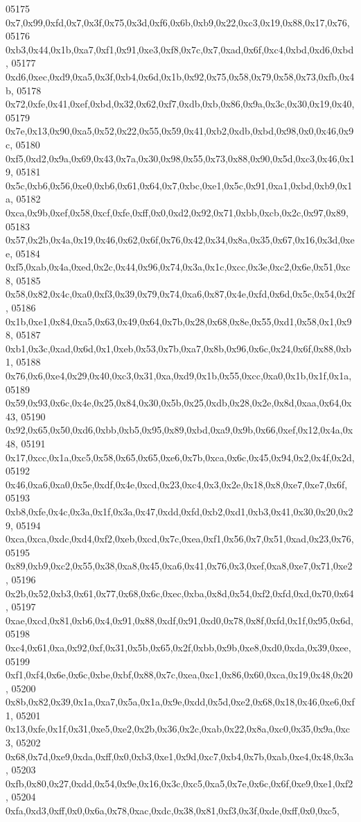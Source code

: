 \begin{DoxyCode}
05175   0x7,0x99,0xfd,0x7,0x3f,0x75,0x3d,0xf6,0x6b,0xb9,0x22,0xc3,0x19,0x88,0x17,0x76,
05176   0xb3,0x44,0x1b,0xa7,0xf1,0x91,0xe3,0xf8,0x7c,0x7,0xad,0x6f,0xc4,0xbd,0xd6,0xbd,
05177   0xd6,0xec,0xd9,0xa5,0x3f,0xb4,0x6d,0x1b,0x92,0x75,0x58,0x79,0x58,0x73,0xfb,0x4b,
05178   0x72,0xfe,0x41,0xef,0xbd,0x32,0x62,0xf7,0xdb,0xb,0x86,0x9a,0x3c,0x30,0x19,0x40,
05179   0x7e,0x13,0x90,0xa5,0x52,0x22,0x55,0x59,0x41,0xb2,0xdb,0xbd,0x98,0x0,0x46,0x9c,
05180   0xf5,0xd2,0x9a,0x69,0x43,0x7a,0x30,0x98,0x55,0x73,0x88,0x90,0x5d,0xc3,0x46,0x19,
05181   0x5c,0xb6,0x56,0xe0,0xb6,0x61,0x64,0x7,0xbc,0xe1,0x5c,0x91,0xa1,0xbd,0xb9,0x1a,
05182   0xca,0x9b,0xef,0x58,0xcf,0xfe,0xff,0x0,0xd2,0x92,0x71,0xbb,0xcb,0x2c,0x97,0x89,
05183   0x57,0x2b,0x4a,0x19,0x46,0x62,0x6f,0x76,0x42,0x34,0x8a,0x35,0x67,0x16,0x3d,0xee,
05184   0xf5,0xab,0x4a,0xed,0x2c,0x44,0x96,0x74,0x3a,0x1c,0xcc,0x3e,0xc2,0x6e,0x51,0xc8,
05185   0x58,0x82,0x4c,0xa0,0xf3,0x39,0x79,0x74,0xa6,0x87,0x4e,0xfd,0x6d,0x5c,0x54,0x2f,
05186   0x1b,0xe1,0x84,0xa5,0x63,0x49,0x64,0x7b,0x28,0x68,0x8e,0x55,0xd1,0x58,0x1,0x98,
05187   0xb1,0x3c,0xad,0x6d,0x1,0xeb,0x53,0x7b,0xa7,0x8b,0x96,0x6c,0x24,0x6f,0x88,0xb1,
05188   0x76,0x6,0xe4,0x29,0x40,0xc3,0x31,0xa,0xd9,0x1b,0x55,0xcc,0xa0,0x1b,0x1f,0x1a,
05189   0x59,0x93,0x6c,0x4e,0x25,0x84,0x30,0x5b,0x25,0xdb,0x28,0x2e,0x8d,0xaa,0x64,0x43,
05190   0x92,0x65,0x50,0xd6,0xbb,0xb5,0x95,0x89,0xbd,0xa9,0x9b,0x66,0xef,0x12,0x4a,0x48,
05191   0x17,0xcc,0x1a,0xc5,0x58,0x65,0x65,0xe6,0x7b,0xca,0x6c,0x45,0x94,0x2,0x4f,0x2d,
05192   0x46,0xa6,0xa0,0x5e,0xdf,0x4e,0xcd,0x23,0xc4,0x3,0x2e,0x18,0x8,0xe7,0xe7,0x6f,
05193   0xb8,0xfe,0x4c,0x3a,0x1f,0x3a,0x47,0xdd,0xfd,0xb2,0xd1,0xb3,0x41,0x30,0x20,0x29,
05194   0xca,0xca,0xdc,0xd4,0xf2,0xeb,0xcd,0x7c,0xea,0xf1,0x56,0x7,0x51,0xad,0x23,0x76,
05195   0x89,0xb9,0xc2,0x55,0x38,0xa8,0x45,0xa6,0x41,0x76,0x3,0xef,0xa8,0xe7,0x71,0xe2,
05196   0x2b,0x52,0xb3,0x61,0x77,0x68,0x6c,0xec,0xba,0x8d,0x54,0xf2,0xfd,0xd,0x70,0x64,
05197   0xae,0xcd,0x81,0xb6,0x4,0x91,0x88,0xdf,0x91,0xd0,0x78,0x8f,0xfd,0x1f,0x95,0x6d,
05198   0xc4,0x61,0xa,0x92,0xf,0x31,0x5b,0x65,0x2f,0xbb,0x9b,0xe8,0xd0,0xda,0x39,0xee,
05199   0xf1,0xf4,0x6e,0x6c,0xbe,0xbf,0x88,0x7c,0xea,0xc1,0x86,0x60,0xca,0x19,0x48,0x20,
05200   0x8b,0x82,0x39,0x1a,0xa7,0x5a,0x1a,0x9e,0xdd,0x5d,0xe2,0x68,0x18,0x46,0xe6,0xf1,
05201   0x13,0xfe,0x1f,0x31,0xe5,0xe2,0x2b,0x36,0x2c,0xab,0x22,0x8a,0xc0,0x35,0x9a,0xc3,
05202   0x68,0x7d,0xe9,0xda,0xff,0x0,0xb3,0xe1,0x9d,0xc7,0xb4,0x7b,0xab,0xe4,0x48,0x3a,
05203   0xfb,0x80,0x27,0xdd,0x54,0x9e,0x16,0x3c,0xc5,0xa5,0x7e,0x6c,0x6f,0xe9,0xe1,0xf2,
05204   0xfa,0xd3,0xff,0x0,0x6a,0x78,0xac,0xdc,0x38,0x81,0xf3,0x3f,0xde,0xff,0x0,0xc5,

\end{DoxyCode}
